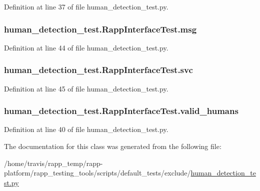 Definition at line 37 of file human\-\_\-detection\-\_\-test.\-py.

\hypertarget{classhuman__detection__test_1_1RappInterfaceTest_ad1df2dde095583380dc11e207e2afdba}{
\subsubsection[{msg}]{\setlength{\rightskip}{0pt plus 5cm}human\-\_\-detection\-\_\-test.\-Rapp\-Interface\-Test.\-msg}}\label{classhuman__detection__test_1_1RappInterfaceTest_ad1df2dde095583380dc11e207e2afdba}


Definition at line 44 of file human\-\_\-detection\-\_\-test.\-py.

\hypertarget{classhuman__detection__test_1_1RappInterfaceTest_a4ab219e015309bc8a3dcc43364c85dc6}{
\subsubsection[{svc}]{\setlength{\rightskip}{0pt plus 5cm}human\-\_\-detection\-\_\-test.\-Rapp\-Interface\-Test.\-svc}}\label{classhuman__detection__test_1_1RappInterfaceTest_a4ab219e015309bc8a3dcc43364c85dc6}


Definition at line 45 of file human\-\_\-detection\-\_\-test.\-py.

\hypertarget{classhuman__detection__test_1_1RappInterfaceTest_ad2f725843b08f9c88d69c2019779fc71}{
\subsubsection[{valid\-\_\-humans}]{\setlength{\rightskip}{0pt plus 5cm}human\-\_\-detection\-\_\-test.\-Rapp\-Interface\-Test.\-valid\-\_\-humans}}\label{classhuman__detection__test_1_1RappInterfaceTest_ad2f725843b08f9c88d69c2019779fc71}


Definition at line 40 of file human\-\_\-detection\-\_\-test.\-py.



The documentation for this class was generated from the following file\-:\begin{DoxyCompactItemize}
\item 
/home/travis/rapp\-\_\-temp/rapp-\/platform/rapp\-\_\-testing\-\_\-tools/scripts/default\-\_\-tests/exclude/\hyperlink{human__detection__test_8py}{human\-\_\-detection\-\_\-test.\-py}\end{DoxyCompactItemize}
